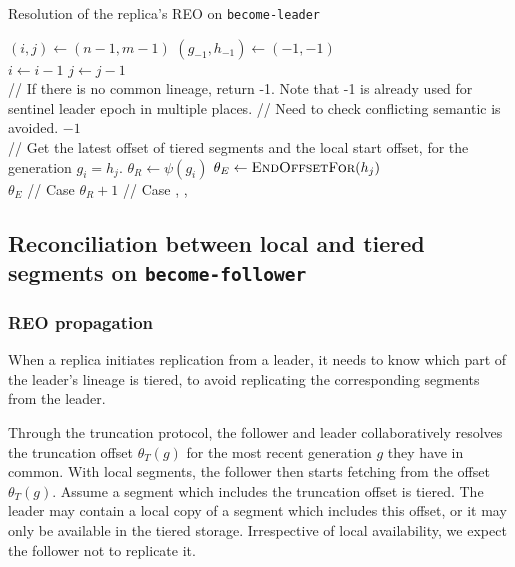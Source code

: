 \documentclass{article}
\newcommand*\circled[1]{\tikz[baseline=(char.base)]{
		\node[shape=circle,draw,inner sep=1pt] (char) {#1};}}
\begin{document}
\begin{algorithm}[h!]
	\caption{Resolution of the replica's REO on \texttt{become-leader}}
	\label{alg:reo}
	
	\begin{algorithmic}[1]
			\State	$(i,j) \leftarrow (n-1,m-1)$
			\State	$(g_{-1}, h_{-1}) \leftarrow (-1,-1)$
			\\
					\State $i \leftarrow i - 1$
				\EndWhile
					\State $j \leftarrow j - 1$
				\EndWhile
			\EndWhile
			\\
			\State // If there is no common lineage, return -1. Note that -1 is already used for sentinel leader epoch in multiple places.
			\State // Need to check conflicting semantic is avoided.
				\State \Return $-1$
			\EndIf
			\\
			\State // Get the latest offset of tiered segments and the local start offset, for the generation $g_i = h_j$.
			\State $\theta_R \leftarrow \psi(g_i)$
			\State $\theta_E \leftarrow  \textsc{EndOffsetFor}(h_j)$
			\\
			\State \Return $\theta_E$ // Case \circled{C}
			\Else
			\State \Return $\theta_R + 1$ // Case \circled{A}, \circled{B}, \circled{D}
			\EndIf
			\\
		\EndFunction
	\end{algorithmic}	
\end{algorithm}

\newpage
\subsection{Reconciliation between local and tiered segments on \texttt{become-follower}}

\subsubsection{REO propagation}

When a replica initiates replication from a leader, it needs to know which part of the leader's lineage is tiered, to avoid replicating the corresponding segments from the leader.

Through the truncation protocol, the follower and leader collaboratively resolves the truncation offset $\theta_T(g)$ for the most recent generation $g$ they have in common. With local segments, the follower then starts fetching from the offset $\theta_T(g)$. Assume a segment which includes the truncation offset is tiered. The leader may contain a local copy of a segment which includes this offset, or it may only be available in the tiered storage. Irrespective of local availability, we expect the follower not to replicate it.
\end{document}
